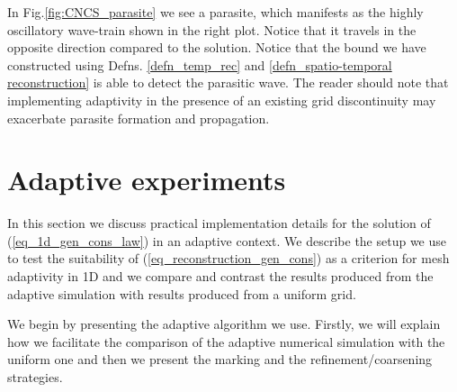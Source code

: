 \documentclass[final]{amsart}
\numberwithin{equation}{section}
\begin{document}

In Fig.\ref{fig:CNCS_parasite} we see a parasite, which manifests as the highly oscillatory wave-train shown in the right plot.  Notice that it travels in the opposite direction compared to the solution.        Notice that the bound we have constructed using  Defns. \ref{defn_temp_rec} and \ref{defn_spatio-temporal reconstruction} is able to detect the parasitic wave.  The reader should note that implementing adaptivity in the presence of an existing grid discontinuity may exacerbate parasite formation and propagation.


\section{Adaptive experiments}\label{sec:adaptive_implementation}
In  this section we discuss practical implementation details for the solution of (\ref{eq_1d_gen_cons_law}) in an adaptive context.   We describe the setup we use to test the suitability of (\ref{eq_reconstruction_gen_cons}) as a criterion for mesh adaptivity in 1D and we compare and contrast the results produced from the adaptive simulation with results produced from a uniform grid.

We begin by  presenting the adaptive algorithm we use.  Firstly, we will explain how we facilitate the comparison of the adaptive numerical simulation with the uniform one and then we present the  marking and the refinement/coarsening strategies.
\end{document}
